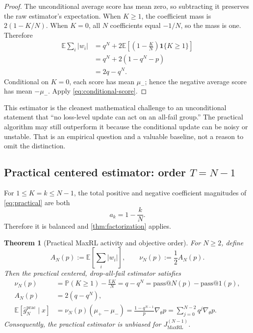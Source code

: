 \documentclass[11pt]{article}
\makeatletter
\newcommand{\E}{\mathbb{E}}
\newcommand{\Prb}{\mathbb{P}}
\newcommand{\ind}{\mathbf{1}}
\newcommand{\grad}{\nabla_{\!\theta}}
\newcommand{\PassAt}[1]{\mathrm{pass@}#1}
\newtheorem{theorem}{Theorem}[section]
\theoremstyle{definition}
\theoremstyle{remark}
\makeatother
\begin{document}
\begin{proof}
The unconditional average score has mean zero, so subtracting it preserves the raw estimator's expectation. When $K\ge1$, the coefficient mass is $2(1-K/N)$. When $K=0$, all $N$ coefficients equal $-1/N$, so the mass is one. Therefore
\begin{align*}
\E\sum_i|w_i|
&=q^N+2\E\left[\left(1-\frac{K}{N}\right)\ind\{K\ge1\}\right]\\
&=q^N+2\left(1-q^N-p\right)\\
&=2q-q^N.
\end{align*}
Conditional on $K=0$, each score has mean $\mu_-$; hence the negative average score has mean $-\mu_-$. Apply \cref{eq:conditional-score}.
\end{proof}

\begin{prioritybox}
This estimator is the cleanest mathematical challenge to an unconditional statement that ``no loss-level update can act on an all-fail group.'' The practical algorithm may still outperform it because the conditional update can be noisy or unstable. That is an empirical question and a valuable baseline, not a reason to omit the distinction.
\end{prioritybox}

\subsection{Practical centered estimator: order $T=N-1$}

For $1\le K=k\le N-1$, the total positive and negative coefficient magnitudes of \cref{eq:practical} are both
\[
a_k=1-\frac{k}{N}.
\]
Therefore it is balanced and \cref{thm:factorization} applies.

\begin{theorem}[Practical MaxRL activity and objective order]
\label{thm:practical}
For $N\ge2$, define
\begin{equation}
A_N(p):=\E\left[\sum_i|w_i|\right],
\qquad
\nu_N(p):=\frac12A_N(p).
\end{equation}
Then the practical centered, drop-all-fail estimator satisfies
\begin{align}
\nu_N(p)
&=\Prb(K\ge1)-\frac{\E K}{N}
=q-q^N
=\PassAt{N}(p)-\PassAt{1}(p),
\label{eq:nu}\\
A_N(p)
&=2(q-q^N),
\label{eq:mass-prac}\\
\E[\widehat g_N^{\mathrm{prac}}\mid x]
&=\nu_N(p)(\mu_+-\mu_-)
=\frac{1-q^{N-1}}{p}\grad p
=\sum_{j=0}^{N-2}q^j\grad p.
\label{eq:practical-gradient}
\end{align}
Consequently, the practical estimator is unbiased for $J_{\mathrm{MaxRL}}^{(N-1)}$.
\end{theorem}
\end{document}
